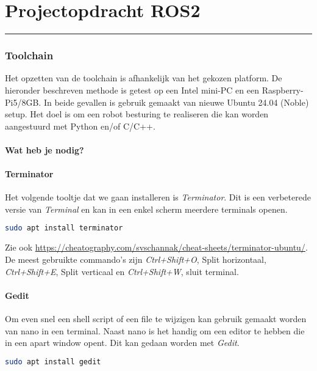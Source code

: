 \documentclass[12pt,a4paper]{exam}
\newcounter{vraagnummer}
\begin{document}
 \maketitle


\newpage
\part*{Projectopdracht ROS2}
\large
\noindent \rule{\linewidth}{0.1mm}
\setcounter{vraagnummer}{0}
\setlength{\abovedisplayskip}{10pt}
\section{Toolchain}
Het opzetten van de toolchain is afhankelijk van het gekozen platform. De hieronder beschreven methode is getest op een Intel mini-PC en een Raspberry-Pi5/8GB. In beide gevallen is gebruik gemaakt van nieuwe Ubuntu 24.04 (Noble) setup. Het doel is om een robot besturing te realiseren die kan worden aangestuurd met Python en/of C/C++.
\subsection{Wat heb je nodig?}

\subsection{Terminator}
Het volgende tooltje dat we gaan installeren is \textit{Terminator}. Dit is een verbeterede versie van \textit{Terminal} en kan in een enkel scherm meerdere terminals openen.
\begin{lstlisting}[language=bash]
sudo apt install terminator
\end{lstlisting}
Zie ook
{\small \url{https://cheatography.com/svschannak/cheat-sheets/terminator-ubuntu/}}. De meest gebruikte commando's zijn
\textit{Ctrl+Shift+O}, Split horizontaal,
\textit{Ctrl+Shift+E}, Split verticaal en
\textit{Ctrl+Shift+W}, sluit terminal.

\subsection{Gedit}
Om even snel een shell script of een file te wijzigen kan gebruik gemaakt worden van nano in een terminal. Naast nano is het handig om een editor te hebben die in een apart window opent. Dit kan gedaan worden met \textit{Gedit}.
\begin{lstlisting}[language=bash]
sudo apt install gedit
\end{lstlisting}
\end{document}
